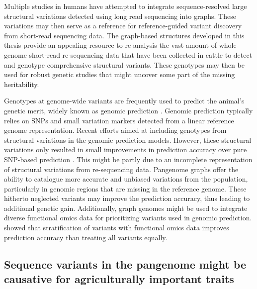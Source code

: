 \documentclass[../main.tex]{subfiles}
\begin{document}
Multiple studies in humans \citep{eggertsson2019graphtyper2,chen2019paragraph,hickey2020genotyping} have attempted to integrate sequence-resolved large structural variations detected using long read sequencing  into graphs. These variations may then serve as a reference for reference-guided variant discovery from short-read sequencing data. The graph-based structures developed in this thesis provide an appealing resource to re-analysis the vast amount of whole-genome short-read re-sequencing data that have been collected in cattle to detect and genotype comprehensive structural variants. These genotypes may then  be used for robust genetic studies that might uncover some part of the missing heritability.

Genotypes at genome-wide variants are frequently used to predict the animal’s genetic merit, widely known as genomic prediction \citep{meuwissen2001prediction}. Genomic prediction typically relies on SNPs and small variation markers detected from a linear reference genome representation. Recent efforts aimed at including genotypes from structural variations in the genomic prediction models. However, these structural variations only resulted in small improvements in prediction accuracy over pure SNP-based prediction \citep{el2018genomic,chen2021investigating}. This might be partly due to an incomplete representation of structural variations from re-sequencing data. Pangenome graphs offer the ability to catalogue more accurate and unbiased variations from the population, particularly in genomic regions that are missing in the reference genome. These hitherto neglected variants may improve the prediction accuracy, thus leading to additional genetic gain. Additionally, graph genomes might be used to integrate diverse functional omics data for prioritizing variants used in genomic prediction. \citet{macleod2016exploiting} showed that stratification of variants with functional omics data improves prediction accuracy than treating all variants equally. 


\subsection*{Sequence variants in the pangenome might be causative for agriculturally important traits}
\end{document}
